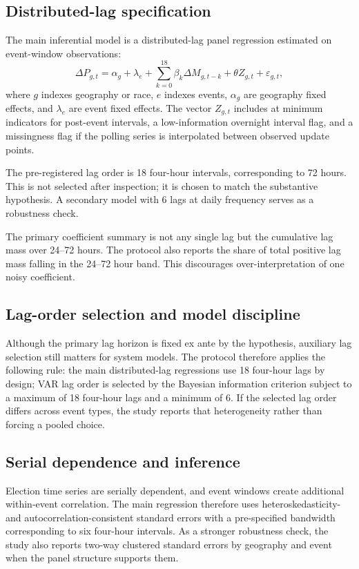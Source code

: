 \documentclass[11pt]{article}
\begin{document}
\subsection{Distributed-lag specification}
The main inferential model is a distributed-lag panel regression estimated on event-window observations:
\[
\Delta P_{g,t} = \alpha_g + \lambda_e + \sum_{k=0}^{18} \beta_k \Delta M_{g,t-k} + \theta Z_{g,t} + \varepsilon_{g,t},
\]
where $g$ indexes geography or race, $e$ indexes events, $\alpha_g$ are geography fixed effects, and $\lambda_e$ are event fixed effects. The vector $Z_{g,t}$ includes at minimum indicators for post-event intervals, a low-information overnight interval flag, and a missingness flag if the polling series is interpolated between observed update points.

The pre-registered lag order is 18 four-hour intervals, corresponding to 72 hours. This is not selected after inspection; it is chosen to match the substantive hypothesis. A secondary model with 6 lags at daily frequency serves as a robustness check.

The primary coefficient summary is not any single lag but the cumulative lag mass over 24--72 hours. The protocol also reports the share of total positive lag mass falling in the 24--72 hour band. This discourages over-interpretation of one noisy coefficient.

\subsection{Lag-order selection and model discipline}
Although the primary lag horizon is fixed ex ante by the hypothesis, auxiliary lag selection still matters for system models. The protocol therefore applies the following rule: the main distributed-lag regressions use 18 four-hour lags by design; VAR lag order is selected by the Bayesian information criterion subject to a maximum of 18 four-hour lags and a minimum of 6. If the selected lag order differs across event types, the study reports that heterogeneity rather than forcing a pooled choice.

\subsection{Serial dependence and inference}
Election time series are serially dependent, and event windows create additional within-event correlation. The main regression therefore uses heteroskedasticity- and autocorrelation-consistent standard errors with a pre-specified bandwidth corresponding to six four-hour intervals. As a stronger robustness check, the study also reports two-way clustered standard errors by geography and event when the panel structure supports them.
\end{document}
